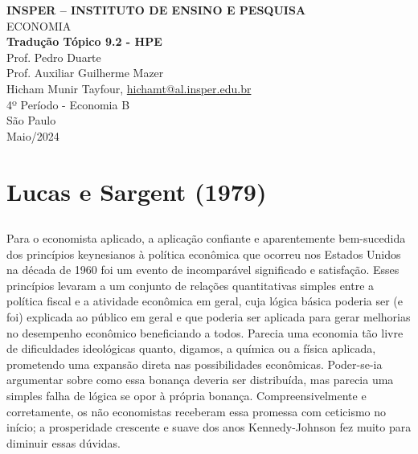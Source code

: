 \documentclass[a4paper,12pt]{article}[abntex2]
\begin{document}
\begin{titlepage}
    \centering
    \vspace*{1cm}
    \Large\textbf{INSPER – INSTITUTO DE ENSINO E PESQUISA}\\
    \Large ECONOMIA\\
    \vspace{1.5cm}
    \Large\textbf{Tradução Tópico 9.2 - HPE}\\
    \vspace{1.5cm}
    Prof. Pedro Duarte\\
    Prof. Auxiliar Guilherme Mazer\\
    \vfill
    \normalsize
    Hicham Munir Tayfour, \href{mailto:hichamt@al.insper.edu.br}{hichamt@al.insper.edu.br}\\
    4º Período - Economia B\\
    \vfill
    São Paulo\\
    Maio/2024
\end{titlepage}

\newpage
\tableofcontents
\thispagestyle{empty} %
\newpage
\setcounter{page}{1} %
\justify
\onehalfspacing

\pagestyle{fancy}
\fancyhf{}
\rhead{\thepage}

\section{\textbf{Lucas e Sargent (1979)}}
\subsection{}

Para o economista aplicado, a aplicação confiante e aparentemente bem-sucedida dos princípios keynesianos à política econômica que ocorreu nos Estados Unidos na década de 1960 foi um evento de incomparável significado e satisfação. Esses princípios levaram a um conjunto de relações quantitativas simples entre a política fiscal e a atividade econômica em geral, cuja lógica básica poderia ser (e foi) explicada ao público em geral e que poderia ser aplicada para gerar melhorias no desempenho econômico beneficiando a todos. Parecia uma economia tão livre de dificuldades ideológicas quanto, digamos, a química ou a física aplicada, prometendo uma expansão direta nas possibilidades econômicas. Poder-se-ia argumentar sobre como essa bonança deveria ser distribuída, mas parecia uma simples falha de lógica se opor à própria bonança. Compreensivelmente e corretamente, os não economistas receberam essa promessa com ceticismo no início; a prosperidade crescente e suave dos anos Kennedy-Johnson fez muito para diminuir essas dúvidas.
\end{document}
